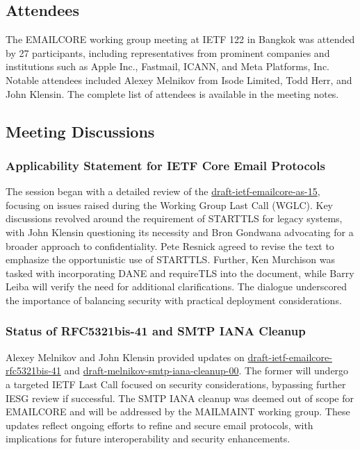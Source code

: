 \documentclass{article}
\begin{document}
\subsection{Attendees}
The EMAILCORE working group meeting at IETF 122 in Bangkok was attended by 27 participants, including representatives from prominent companies and institutions such as Apple Inc., Fastmail, ICANN, and Meta Platforms, Inc. Notable attendees included Alexey Melnikov from Isode Limited, Todd Herr, and John Klensin. The complete list of attendees is available in the meeting notes.

\subsection{Meeting Discussions}

\subsubsection{Applicability Statement for IETF Core Email Protocols}
The session began with a detailed review of the \href{https://datatracker.ietf.org/doc/html/draft-ietf-emailcore-as-15}{draft-ietf-emailcore-as-15}, focusing on issues raised during the Working Group Last Call (WGLC). Key discussions revolved around the requirement of STARTTLS for legacy systems, with John Klensin questioning its necessity and Bron Gondwana advocating for a broader approach to confidentiality. Pete Resnick agreed to revise the text to emphasize the opportunistic use of STARTTLS. Further, Ken Murchison was tasked with incorporating DANE and requireTLS into the document, while Barry Leiba will verify the need for additional clarifications. The dialogue underscored the importance of balancing security with practical deployment considerations.

\subsubsection{Status of RFC5321bis-41 and SMTP IANA Cleanup}
Alexey Melnikov and John Klensin provided updates on \href{https://datatracker.ietf.org/doc/html/draft-ietf-emailcore-rfc5321bis-41}{draft-ietf-emailcore-rfc5321bis-41} and \href{https://datatracker.ietf.org/doc/html/draft-melnikov-smtp-iana-cleanup-00}{draft-melnikov-smtp-iana-cleanup-00}. The former will undergo a targeted IETF Last Call focused on security considerations, bypassing further IESG review if successful. The SMTP IANA cleanup was deemed out of scope for EMAILCORE and will be addressed by the MAILMAINT working group. These updates reflect ongoing efforts to refine and secure email protocols, with implications for future interoperability and security enhancements.
\end{document}
